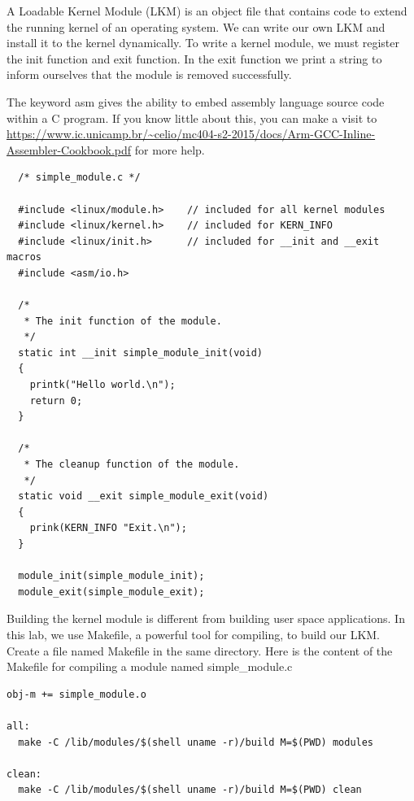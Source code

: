 A Loadable Kernel Module (LKM) is an object file that contains code to extend
the running kernel of an operating system. We can write our own LKM and install
it to the kernel dynamically. To write a kernel module, we must register the
init function and exit function. 
In the exit function we print a string to inform ourselves that the module is removed successfully.

The keyword asm gives the ability to embed assembly language source code within a C program. If you know little about this, you can make a visit to \url{https://www.ic.unicamp.br/~celio/mc404-s2-2015/docs/Arm-GCC-Inline-Assembler-Cookbook.pdf} for more help.


\begin{lstlisting}
  /* simple_module.c */
  
  #include <linux/module.h>    // included for all kernel modules
  #include <linux/kernel.h>    // included for KERN_INFO
  #include <linux/init.h>      // included for __init and __exit macros
  #include <asm/io.h>
  
  /*
   * The init function of the module.
   */
  static int __init simple_module_init(void)
  {
    printk("Hello world.\n");
    return 0;
  }
  
  /*
   * The cleanup function of the module.
   */
  static void __exit simple_module_exit(void)
  {
    prink(KERN_INFO "Exit.\n");
  }
  
  module_init(simple_module_init);
  module_exit(simple_module_exit);

\end{lstlisting}

Building the kernel module is different from building user space applications. In this lab, we use Makefile, a powerful tool for compiling, to build our LKM. Create a file named Makefile in the same directory. Here is the content of the Makefile for compiling a module named simple\_module.c

\begin{lstlisting}
obj-m += simple_module.o

all:
  make -C /lib/modules/$(shell uname -r)/build M=$(PWD) modules

clean:
  make -C /lib/modules/$(shell uname -r)/build M=$(PWD) clean
\end{lstlisting}

